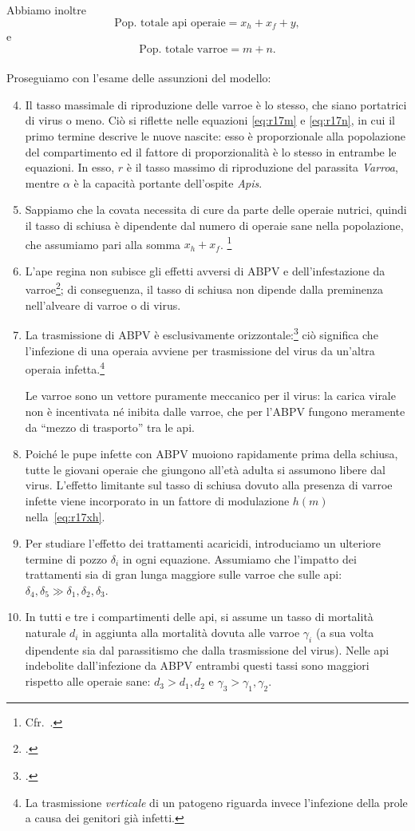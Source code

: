 Abbiamo inoltre
$$\text{Pop. totale api operaie} = x_h + x_f + y,$$
e
$$\text{Pop. totale varroe} = m + n.$$

\paragraph{}
Proseguiamo con l'esame delle assunzioni del modello:
\begin{enumerate}
    \setcounter{enumi}{3}
    \item Il tasso massimale di riproduzione delle varroe è lo stesso, che siano portatrici di virus o meno.
    Ciò si riflette nelle equazioni \eqref{eq:r17m} e \eqref{eq:r17n}, in cui il primo termine descrive le nuove nascite: esso è proporzionale alla popolazione del compartimento ed il fattore di proporzionalità è lo stesso in entrambe le equazioni. In esso, $r$ è il tasso massimo di riproduzione del parassita \emph{Varroa}, mentre $\alpha$ è la capacità portante dell'ospite \emph{Apis}.
    \item Sappiamo che la covata necessita di cure da parte delle operaie nutrici, quindi il tasso di schiusa è dipendente dal numero di operaie sane nella popolazione, che assumiamo pari alla somma $x_h + x_f$.
    \footnote{Cfr.~\cite{khoury2011}.}
    \item L'ape regina non subisce gli effetti avversi di ABPV e dell'infestazione da varroe\footcite{privFDL}; di conseguenza, il tasso di schiusa non dipende dalla preminenza nell'alveare di varroe o di virus.
    \item La trasmissione di ABPV è esclusivamente orizzontale:\footcite{privFDL}
    ciò significa che l'infezione di una operaia avviene per trasmissione del virus da un'altra operaia infetta.\footnote{La trasmissione \emph{verticale} di un patogeno riguarda invece l'infezione della prole a causa dei genitori già infetti.}

    Le varroe sono un vettore puramente meccanico per il virus: la carica virale non è incentivata né
    inibita dalle varroe, che per l'ABPV fungono meramente da ``mezzo di trasporto'' tra le api.
    \item Poiché le pupe infette con ABPV muoiono rapidamente prima della schiusa, tutte le giovani operaie che
    giungono all'età adulta si assumono libere dal virus. L'effetto limitante sul tasso di schiusa dovuto alla
    presenza di varroe infette viene incorporato in un fattore di modulazione $h(m)$ nella~\eqref{eq:r17xh}.
    \item Per studiare l'effetto dei trattamenti acaricidi, introduciamo un ulteriore termine di pozzo $\delta_i$ in ogni equazione. Assumiamo che l'impatto dei trattamenti sia di gran lunga maggiore sulle varroe che sulle api: $\delta_4, \delta_5 \gg \delta_1, \delta_2, \delta_3$.
    \item In tutti e tre i compartimenti delle api, si assume un tasso di mortalità naturale $d_i$ in aggiunta alla mortalità dovuta alle varroe $\gamma_i$ (a sua volta dipendente sia dal parassitismo che dalla trasmissione del virus). Nelle api indebolite dall'infezione da ABPV entrambi questi tassi sono maggiori rispetto alle operaie sane: $d_3 > d_1, d_2$ e $\gamma_3 > \gamma_1, \gamma_2$.


\end{enumerate}
